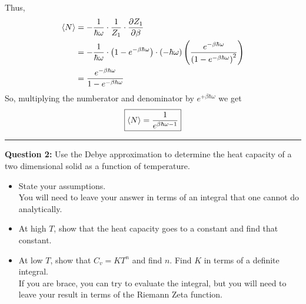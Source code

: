 \documentclass[11pt]{article}
\begin{document}
\\
\\
Thus, 
\begin{align*}
  \langle N \rangle &= -\frac{1}{\hbar \omega} \cdot \frac{1}{Z_1} \cdot \frac{\partial Z_1}{\partial \beta} \\
  &= -\frac{1}{\hbar \omega} \cdot \left(1-e^{-\beta\hbar\omega}\right) \cdot \left(-\hbar \omega\right) \left( \frac{e^{-\beta \hbar \omega}}{\left(1-e^{-\beta \hbar \omega}\right)^2} \right) \\
  &= \frac{e^{-\beta \hbar \omega}}{1-e^{-\beta \hbar \omega}} 
\end{align*}
So, multiplying the numberator and denominator by $e^{+\beta \hbar \omega}$ we get $$ \boxed{\langle N \rangle = \frac{1}{e^{\beta \hbar \omega - 1}} } $$


\vskip 0.5cm
\hrule
\pagebreak





\begin{bluebox}
  \textbf{Question 2:} Use the Debye approximation to determine the heat capacity of a two dimensional solid as a function of temperature.
  \begin{itemize}
    \item State your assumptions.
    \\
    You will need to leave your answer in terms of an integral that one cannot do analytically.

    \item At high $T$, show that the heat capacity goes to a constant and find that constant.

    \item At low $T$, show that $C_v = KT^n$ and find $n$. Find $K$ in terms of a definite integral. 
    \\
    If you are brace, you can try to evaluate the integral, but you will need to leave your result in terms of the Riemann Zeta function.
  \end{itemize}
\end{bluebox}
\end{document}
